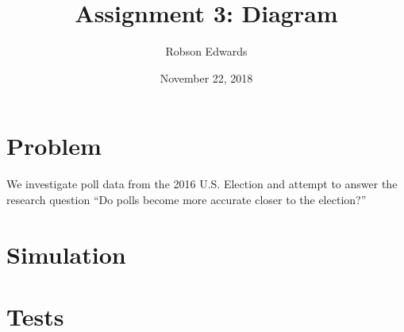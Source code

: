 \documentclass[11pt, oneside]{article}
\title{Assignment 3: Diagram}
\author{Robson Edwards}
\date{November 22, 2018}		%
\begin{document}
\maketitle

\section{Problem}

We investigate poll data from the 2016 U.S. Election and attempt to answer the research question ``Do polls become more accurate closer to the election?''

\section{Simulation}



\section{Tests}
\end{document}
